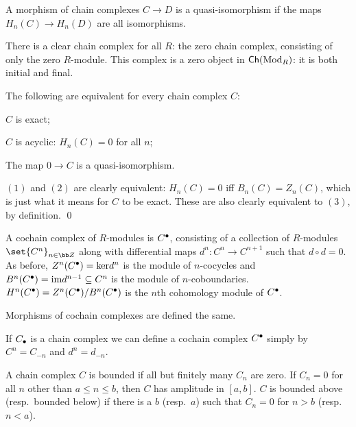 \eexam

\bdefn

    A morphism of chain complexes $C\to D$ is a {\emphcolor quasi-isomorphism} if the maps $H_n(C)\to H_n(D)$ are all isomorphisms.

\edefn

There is a clear chain complex for all $R$: the zero chain complex, consisting of only the zero $R$-module.
This complex is a zero object in ${\sf Ch}({\rm Mod}_R)$: it is both initial and final.

\bprop

    The following are equivalent for every chain complex $C$:
    \benum
        \item $C$ is exact;
        \item $C$ is {\emphcolor acyclic}: $H_n(C)=0$ for all $n$;
        \item The map $0\to C$ is a quasi-isomorphism.
    \eenum

\eprop

\bproof

    $(1)$ and $(2)$ are clearly equivalent: $H_n(C)=0$ iff $B_n(C)=Z_n(C)$, which is just what it means for $C$ to be exact.
    These are also clearly equivalent to $(3)$, by definition.
    \qed

\eproof

\bdefn

    A {\emphcolor cochain complex} of $R$-modules is $C^\bullet$, consisting of a collection of $R$-modules $\set{C^n}_{n\in\bZ}$ along with differential maps
    $d^n\colon C^n\to C^{n+1}$ such that $d\circ d=0$.
    As before, $Z^n(C^\bullet)={\rm ker} d^n$ is the module of {\emphcolor $n$-cocycles} and $B^n(C^\bullet)={\rm im} d^{n-1}\subseteq C^n$ is the module of {\emphcolor $n$-coboundaries}.
    $H^n(C^\bullet)=Z^n(C^\bullet)/B^n(C^\bullet)$ is the {\emphcolor $n$th cohomology module} of $C^\bullet$.

    Morphisms of cochain complexes are defined the same.

\edefn

If $C_\bullet$ is a chain complex we can define a cochain complex $C^\bullet$ simply by $C^n=C_{-n}$ and $d^n=d_{-n}$.

\bdefn

    A chain complex $C$ is {\emphcolor bounded} if all but finitely many $C_n$ are zero.
    If $C_n=0$ for all $n$ other than $a\leq n\leq b$, then $C$ has {\emphcolor amplitude in $[a,b]$}.
    $C$ is {\emphcolor bounded above} (resp.\ {\emphcolor bounded below}) if there is a $b$ (resp.\ $a$) such that $C_n=0$ for $n>b$ (resp.\ $n<a$).

